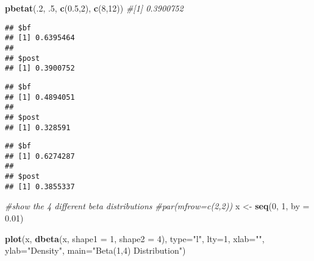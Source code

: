 \documentclass[]{tufte-handout}
\newenvironment{Shaded}{}{}
\newcommand{\KeywordTok}[1]{\textcolor[rgb]{0.00,0.44,0.13}{\textbf{{#1}}}}
\newcommand{\DataTypeTok}[1]{\textcolor[rgb]{0.56,0.13,0.00}{{#1}}}
\newcommand{\DecValTok}[1]{\textcolor[rgb]{0.25,0.63,0.44}{{#1}}}
\newcommand{\FloatTok}[1]{\textcolor[rgb]{0.25,0.63,0.44}{{#1}}}
\newcommand{\StringTok}[1]{\textcolor[rgb]{0.25,0.44,0.63}{{#1}}}
\newcommand{\CommentTok}[1]{\textcolor[rgb]{0.38,0.63,0.69}{\textit{{#1}}}}
\newcommand{\NormalTok}[1]{{#1}}
\begin{document}
\begin{Shaded}
\begin{Highlighting}[]
\KeywordTok{pbetat}\NormalTok{(.}\DecValTok{2}\NormalTok{, .}\DecValTok{5}\NormalTok{, }\KeywordTok{c}\NormalTok{(}\FloatTok{0.5}\NormalTok{,}\DecValTok{2}\NormalTok{), }\KeywordTok{c}\NormalTok{(}\DecValTok{8}\NormalTok{,}\DecValTok{12}\NormalTok{)) }\CommentTok{#[1] 0.3900752}
\end{Highlighting}
\end{Shaded}

\begin{verbatim}
## $bf
## [1] 0.6395464
## 
## $post
## [1] 0.3900752
\end{verbatim}

\begin{Shaded}
\end{Shaded}

\begin{verbatim}
## $bf
## [1] 0.4894051
## 
## $post
## [1] 0.328591
\end{verbatim}

\begin{Shaded}
\end{Shaded}

\begin{verbatim}
## $bf
## [1] 0.6274287
## 
## $post
## [1] 0.3855337
\end{verbatim}

\begin{Shaded}
\begin{Highlighting}[]
\CommentTok{#show the 4 different beta distributions}
\CommentTok{#par(mfrow=c(2,2))}
\NormalTok{x <-}\StringTok{ }\KeywordTok{seq}\NormalTok{(}\DecValTok{0}\NormalTok{, }\DecValTok{1}\NormalTok{, }\DataTypeTok{by =} \FloatTok{0.01}\NormalTok{)}

\KeywordTok{plot}\NormalTok{(x, }\KeywordTok{dbeta}\NormalTok{(x, }\DataTypeTok{shape1 =} \DecValTok{1}\NormalTok{, }\DataTypeTok{shape2 =} \DecValTok{4}\NormalTok{), }\DataTypeTok{type=}\StringTok{"l"}\NormalTok{, }\DataTypeTok{lty=}\DecValTok{1}\NormalTok{, }\DataTypeTok{xlab=}\StringTok{""}\NormalTok{, }\DataTypeTok{ylab=}\StringTok{"Density"}\NormalTok{, }\DataTypeTok{main=}\StringTok{"Beta(1,4) Distribution"}\NormalTok{)}
\end{Highlighting}
\end{Shaded}
\end{document}
